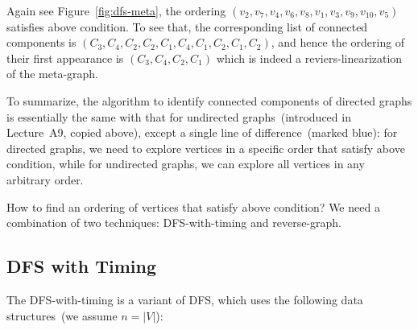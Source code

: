 Again see Figure~\ref{fig:dfs-meta}, the ordering 
$( v_{2} ,v_{7} ,v_{4} ,v_{6} ,v_{8} ,v_{1} ,v_{3} ,v_{9} ,v_{10} ,v_{5})$ satisfies above condition.
To see that, the corresponding list of connected components is 
$(C_3, C_4, C_2, C_2, C_1, C_4, C_1, C_2, C_1, C_2)$,
and hence the ordering of their first appearance is $(C_3, C_4, C_2, C_1)$ which is indeed a reviers-linearization of the meta-graph.

\begin{minipage}{0.8\textwidth}
	\xxx
	\xxx
	\xxx
	\xxx
	\xxx
	\xxx
	\xxx
	\xxx
	\xxx
\end{minipage}

\begin{minipage}{0.8\textwidth}
	\xxx
	\xxx
	\xxx
	\xxx
	\xxx
	\xxx
\end{minipage}

To summarize, the algorithm to identify connected components of directed graphs
is essentially the same with that for undirected graphs~(introduced in Lecture~A9, copied above), 
except a single line of difference~(marked blue): for directed graphs,
we need to explore vertices in a specific order that satisfy above condition,
while for undirected graphs, we can explore all vertices in any arbitrary order.

How to find an ordering of vertices that satisfy above condition?
We need a combination of two techniques: DFS-with-timing and reverse-graph.



\subsection*{DFS with Timing}

The DFS-with-timing is a variant of DFS, which uses the following
data structures~(we assume $n = |V|$):


